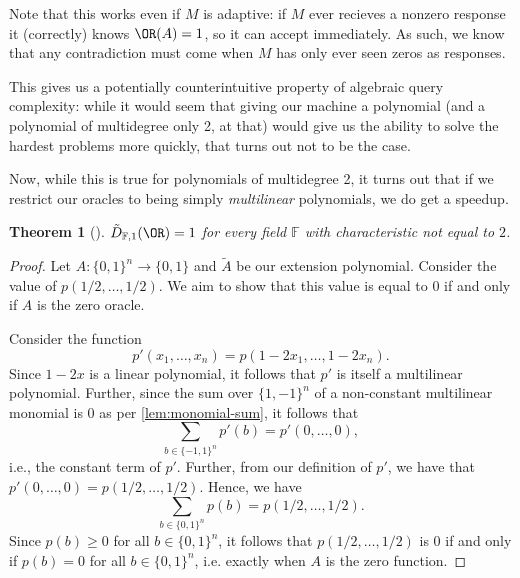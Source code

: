 \documentclass[english]{reedthesis}
\theoremstyle{plain}
\newtheorem{thm}{Theorem}[section]
\theoremstyle{definition}
\theoremstyle{remark}
\begin{document}
Note that this works even if $M$ is adaptive: if $M$ ever recieves a nonzero
response it (correctly) knows $\OR(A) = 1$, so it can accept immediately. As
such, we know that any contradiction must come when $M$ has only ever seen zeros
as responses.

This gives us a potentially counterintuitive property of algebraic query
complexity: while it would seem that giving our machine a polynomial (and a
polynomial of multidegree only 2, at that) would give us the ability to solve
the hardest problems more quickly, that turns out not to be the case.

Now, while this is true for polynomials of multidegree 2, it turns out that if
we restrict our oracles to being simply \emph{multilinear} polynomials, we do
get a speedup.

\begin{thm}[{\cite[Thm. 3]{JKRS09}}]\label{thm:or-multilinear}
  $\tilde{D}_{\mathbb{F},1}(\OR) = 1$ for every field $\mathbb{F}$ with
  characteristic not equal to $2$.
\end{thm}

\begin{proof}
  Let $A: \{0, 1\}^{n} \rightarrow \{0, 1\}$ and $\tilde{A}$ be our extension polynomial.
  Consider the value of $p(1/2, \ldots, 1/2)$. We aim to show that this value is
  equal to $0$ if and only if $A$ is the zero oracle.

  Consider the function
  \begin{equation}
    p'(x_{1}, \ldots, x_{n}) = p(1 - 2x_{1}, \ldots, 1 - 2x_{n}).
  \end{equation}
  Since $1 - 2x$ is a linear polynomial, it follows that $p'$ is itself a
  multilinear polynomial. Further, since the sum over $\{1, -1\}^{n}$ of a
  non-constant multilinear monomial is 0 as per \cref{lem:monomial-sum}, it
  follows that
  \begin{equation}
    \sum_{b \in \{-1, 1\}^{n}}p'(b) = p'(0, \ldots, 0),
  \end{equation}
  i.e., the constant term of $p'$. Further, from our definition of $p'$, we have
  that $p'(0, \ldots, 0) = p(1/2, \ldots, 1/2)$. Hence, we have
  \begin{equation}
    \sum_{b \in \{0, 1\}^{n}}p(b) = p(1/2, \ldots, 1/2).
  \end{equation}
  Since $p(b) \ge 0$ for all $b \in \{0, 1\}^{n}$, it follows that $p(1/2, \ldots, 1/2)$
  is 0 if and only if $p(b) = 0$ for all $b \in \{0, 1\}^{n}$, i.e. exactly when
  $A$ is the zero function.
\end{proof}
\end{document}
